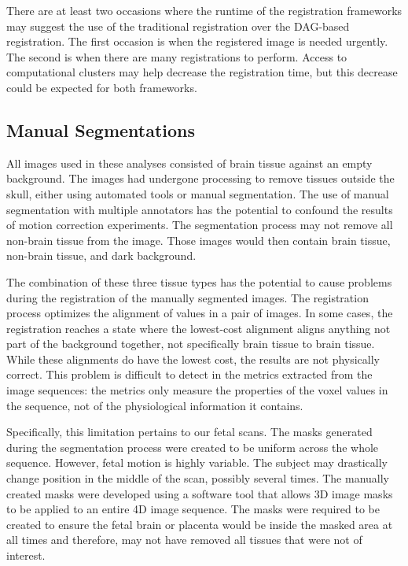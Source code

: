 There are at least two occasions where the runtime of the registration frameworks may suggest the use of the traditional registration over the DAG-based registration. The first occasion is when the registered image is needed urgently. The second is when there are many registrations to perform. Access to computational clusters may help decrease the registration time, but this decrease could be expected for both frameworks.

\subsection{Manual Segmentations}

All images used in these analyses consisted of brain tissue against an empty background. The images had undergone processing to remove tissues outside the skull, either using automated tools or manual segmentation. The use of manual segmentation with multiple annotators has the potential to confound the results of motion correction experiments. The segmentation process may not remove all non-brain tissue from the image. Those images would then contain brain tissue, non-brain tissue, and dark background. 

The combination of these three tissue types has the potential to cause problems during the registration of the manually segmented images. The registration process optimizes the alignment of values in a pair of images. In some cases, the registration reaches a state where the lowest-cost alignment aligns anything not part of the background together, not specifically brain tissue to brain tissue. While these alignments do have the lowest cost, the results are not physically correct. This problem is difficult to detect in the metrics extracted from the image sequences: the metrics only measure the properties of the voxel values in the sequence, not of the physiological information it contains. 

Specifically, this limitation pertains to our fetal scans. The masks generated during the segmentation process were created to be uniform across the whole sequence. However, fetal motion is highly variable. The subject may drastically change position in the middle of the scan, possibly several times. The manually created masks were developed using a software tool that allows 3D image masks to be applied to an entire 4D image sequence. The masks were required to be created to ensure the fetal brain or placenta would be inside the masked area at all times and therefore, may not have removed all tissues that were not of interest.

